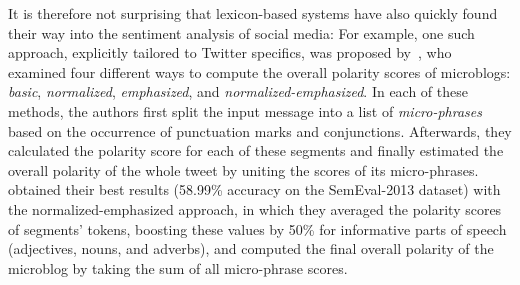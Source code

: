 
It is therefore not surprising that lexicon-based systems have also
quickly found their way into the sentiment analysis of social media:
For example, one such approach, explicitly tailored to Twitter
specifics, was proposed by~\citet{Musto:14}, who examined four
different ways to compute the overall polarity scores of microblogs:
\emph{basic}, \emph{normalized}, \emph{emphasized}, and
\emph{normalized-emphasized}.  %
In each of these methods, the authors first split the input message
into a list of \emph{micro-phrases} based on the occurrence of
punctuation marks and conjunctions.  Afterwards, they calculated the
polarity score for each of these segments and finally estimated the
overall polarity of the whole tweet by uniting the scores of its
micro-phrases.  \citeauthor{Musto:14} obtained their best results
(58.99\% accuracy on the SemEval-2013 dataset) with the
normalized-emphasized approach, in which they averaged the polarity
scores of segments' tokens, boosting these values by 50\% for
informative parts of speech (adjectives, nouns, and adverbs), and
computed the final overall polarity of the microblog by taking the sum
of all micro-phrase scores.


